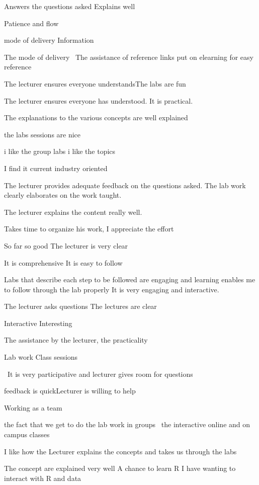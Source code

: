 \documentclass[
]{article}
\begin{document}
\begin{enumerate}
\begin{itemize}
    Answers the questions asked Explains well

    Patience and flow

    mode of delivery Information

    The mode of delivery~ The assistance of reference links put on
    elearning for easy reference~

    The lecturer ensures everyone understandsThe labs are fun

    The lecturer ensures everyone has understood. It is practical.

    The explanations to the various concepts are well explained~

    the labs sessions are nice

    i like the group labs i like the topics

    I find it current industry oriented

    The lecturer provides adequate feedback on the questions asked. The
    lab work clearly elaborates on the work taught.

    The lecturer explains the content really well.

    Takes time to organize his work, I appreciate the effort

    So far so good The lecturer is very clear

    It is comprehensive It is easy to follow

    Labs that describe each step to be followed are engaging and
    learning enables me to follow through the lab properly It is very
    engaging and interactive.

    The lecturer asks questions The lectures are clear~

    Interactive Interesting~

    The assistance by the lecturer, the practicality

    Lab work Class sessions

    ~It is very participative and lecturer gives room for questions

    feedback is quickLecturer is willing to help

    Working as a team

    the fact that we get to do the lab work in groups~ the interactive
    online and on campus classes

    I like how the Lecturer explains the concepts and takes us through
    the labs

    The concept are explained very well A chance to learn R I have
    wanting to interact with R and data


\end{itemize}
\end{enumerate}
\end{document}
